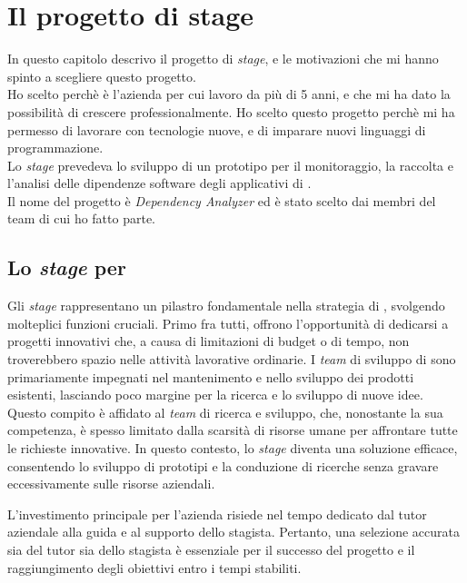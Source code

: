 \chapter{Il progetto di stage}
\label{cap:ilprogettodistage}

In questo capitolo descrivo il progetto di \textit{stage}, e le motivazioni che mi hanno spinto a scegliere questo progetto.\\
Ho scelto {\azienda} perchè è l'azienda per cui lavoro da più di 5 anni, e che mi ha dato la possibilità di crescere professionalmente.
Ho scelto questo progetto perchè mi ha permesso di lavorare con tecnologie nuove, e di imparare nuovi linguaggi di programmazione.\\
Lo \textit{stage} prevedeva lo sviluppo di un prototipo per il monitoraggio, la raccolta e l'analisi delle dipendenze software degli applicativi di {\azienda}.\\
Il nome del progetto è \textit{Dependency Analyzer} ed è stato scelto dai membri del team di cui ho fatto parte.\\
\section{Lo \textit{stage} per \azienda}

Gli \textit{stage} rappresentano un pilastro fondamentale nella strategia di {\azienda}, svolgendo molteplici funzioni cruciali. 
Primo fra tutti, offrono l'opportunità di dedicarsi a progetti innovativi che, a causa di limitazioni di budget o di tempo, 
non troverebbero spazio nelle attività lavorative ordinarie. I \textit{team} di sviluppo di {\azienda} sono primariamente impegnati 
nel mantenimento e nello sviluppo dei prodotti esistenti, lasciando poco margine per la ricerca e lo sviluppo di nuove idee. 
Questo compito è affidato al \textit{team} di ricerca e sviluppo, che, nonostante la sua competenza, è spesso limitato dalla scarsità 
di risorse umane per affrontare tutte le richieste innovative. In questo contesto, lo \textit{stage} diventa una soluzione efficace, 
consentendo lo sviluppo di prototipi e la conduzione di ricerche senza gravare eccessivamente sulle risorse aziendali.

L'investimento principale per l'azienda risiede nel tempo dedicato dal tutor aziendale alla guida e al supporto dello stagista. 
Pertanto, una selezione accurata sia del tutor sia dello stagista è essenziale per il successo del progetto e il raggiungimento 
degli obiettivi entro i tempi stabiliti.

